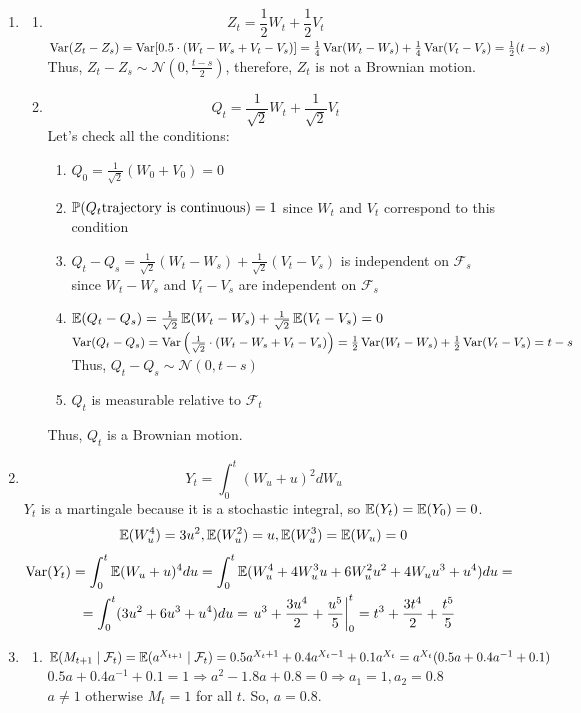 \documentclass[12pt, a4paper]{article}
\newcommand{\cF}{\mathcal{F}}
\newcommand{\cN}{\mathcal{N}}
\begin{document}
\begin{enumerate}

\item
\begin{enumerate}
\item
\[
Z_t=\frac12 W_t+\frac12 V_t
\]
$\Var(Z_t-Z_s)=\Var[0.5\cdot(W_t-W_s+V_t-V_s)]=\frac14 \Var(W_t-W_s)+\frac14 \Var(V_t-V_s)=\frac12(t-s)$
Thus, $Z_t-Z_s\sim \cN\left(0,\frac{t-s}{2}\right)$, therefore, $Z_t$ is not a Brownian motion.

\item
\[
Q_t=\frac1{\sqrt2} W_t+\frac1{\sqrt2} V_t
\]
Let's check all the conditions:
\begin{enumerate}
\item $Q_0=\frac1{\sqrt2}(W_0+V_0)=0$\\
\item $\P(Q_t \text{trajectory is continuous}) = 1$ since $W_t$ and $V_t$ correspond to this condition
\item $Q_t-Q_s=\frac1{\sqrt2}(W_t-W_s)+\frac1{\sqrt2}(V_t-V_s)$ is independent on $\cF_s$ since $W_t-W_s$ and $V_t-V_s$ are independent on $\cF_s$\\
\item $\E(Q_t-Q_s)=\frac1{\sqrt2} \E(W_t-W_s)+\frac1{\sqrt2} \E(V_t-V_s)=0$\\
$\Var(Q_t-Q_s)=\Var\left(\frac1{\sqrt2}\cdot(W_t-W_s+V_t-V_s)\right)=\frac12 \Var(W_t-W_s)+\frac12 \Var(V_t-V_s)=t-s$
Thus, $Q_t-Q_s\sim \cN\left(0,t-s\right)$\\
\item $Q_t$ is measurable relative to $\cF_t$
\end{enumerate}

Thus, $Q_t$ is a Brownian motion.
\end{enumerate}

\item
\[
Y_t=\int_0^t(W_u+u)^2dW_u
\]
$Y_t$ is a martingale because it is a stochastic integral, so $\E(Y_t)=\E(Y_0)=0$.
\[
\E(W_u^4)=3u^2, \E(W_u^2)=u, \E(W_u^3)=\E(W_u)=0
\]
\begin{multline}
\Var(Y_t)=\int_0^t \E(W_u+u)^4du=\int_0^t\E(W_u^4+4W_u^3u+6W_u^2u^2+4W_uu^3+u^4)du= \\
=\int_0^t(3u^2+6u^3+u^4)du=\left.u^3+\frac{3u^4}{2}+\frac{u^5}{5}\right|^t_0=t^3+\frac{3t^4}{2}+\frac{t^5}{5}
\end{multline}


\item
\begin{enumerate}
\item $\E(M_{t+1} \mid \cF_t)=\E(a^{X_{t+1}} \mid \cF_t)=0.5a^{X_t+1}+0.4a^{X_t-1}+0.1a^{X_t}=a^{X_t}(0.5a+0.4a^{-1}+0.1)$\\
$0.5a+0.4a^{-1}+0.1=1\Rightarrow a^2-1.8a+0.8=0\Rightarrow a_1=1,a_2=0.8$\\
$a\neq1$ otherwise $M_t=1$ for all $t$. So, $a=0.8$.


\end{enumerate}
\end{enumerate}
\end{document}
